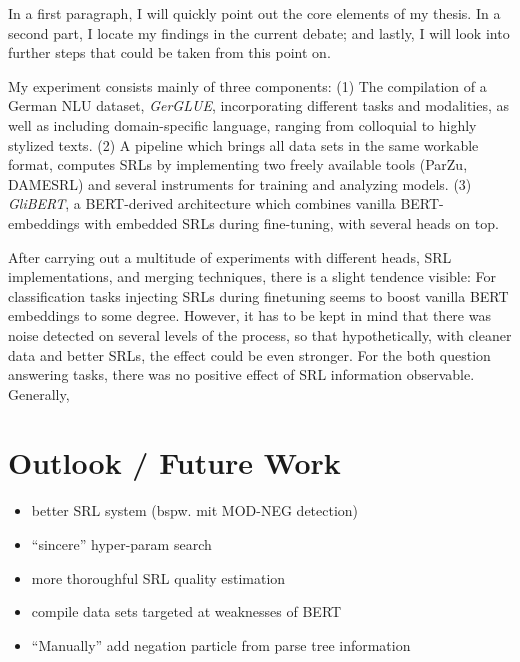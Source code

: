 \label{chap:6_conclusion}


In a first paragraph, I will quickly point out the core elements of my thesis. In a second part, I
locate my findings in the current debate; and lastly, I will look into further steps that could be
taken from this point on.

My experiment consists mainly of three components: (1) The compilation of a German NLU
dataset, \emph{GerGLUE}, incorporating different tasks and modalities, as well as
including domain-specific language, ranging from colloquial to highly stylized texts.
(2) A pipeline which brings all data sets in the same workable format, computes SRLs
by implementing two freely available tools (ParZu, DAMESRL) and several instruments
for training and analyzing models. (3) \emph{GliBERT}, a BERT-derived architecture
which combines vanilla BERT-embeddings with embedded SRLs during fine-tuning, with
several heads on top.

After carrying out a multitude of experiments with different heads, SRL implementations,
and merging techniques, there is a slight tendence visible: For classification tasks
injecting SRLs during finetuning seems to boost vanilla BERT embeddings to some degree.
However, it has to be kept in mind that there was noise detected on several levels of
the process, so that hypothetically, with cleaner data and better SRLs, the effect
could be {\color{red} even stronger}. For the both question answering tasks, there
was no positive effect of SRL information observable. Generally,



\section{Outlook / Future Work}



\begin{itemize}
  \item better SRL system (bspw. mit MOD-NEG detection)
  \item ``sincere'' hyper-param search
  \item more thoroughful SRL quality estimation
  \item compile data sets targeted at weaknesses of BERT
  \item ``Manually'' add negation particle from parse tree information
\end{itemize}


